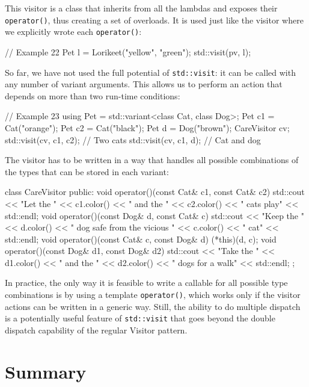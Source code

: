 This visitor is a class that inherits from all the lambdas and exposes their \texttt{operator()}, thus creating a set of overloads. It is used just like the visitor where we explicitly wrote each \texttt{operator()}:

\begin{code}
// Example 22
Pet l = Lorikeet("yellow", "green");
std::visit(pv, l);
\end{code}

So far, we have not used the full potential of \texttt{std::visit}: it can be called with any number of variant arguments. This allows us to perform an action that depends on more than two run-time conditions:

\begin{code}
// Example 23
using Pet = std::variant<class Cat, class Dog>;
Pet c1 = Cat("orange");
Pet c2 = Cat("black");
Pet d = Dog("brown");
CareVisitor cv;
std::visit(cv, c1, c2);      // Two cats
std::visit(cv, c1, d);     // Cat and dog
\end{code}

The visitor has to be written in a way that handles all possible combinations of the types that can be stored in each variant:

\begin{code}
class CareVisitor {
  public:
  void operator()(const Cat& c1, const Cat& c2) {
    std::cout << "Let the " << c1.color() << " and the "
              << c2.color() << " cats play" << std::endl; }
  void operator()(const Dog& d, const Cat& c) {
    std::cout << "Keep the " << d.color()
              << " dog safe from the vicious " << c.color()
              << " cat" << std::endl; }
  void operator()(const Cat& c, const Dog& d) {
    (*this)(d, c);
  }
  void operator()(const Dog& d1, const Dog& d2) {
    std::cout << "Take the " << d1.color() << " and the "
              << d2.color() << " dogs for a walk"
              << std::endl; }
};
\end{code}

In practice, the only way it is feasible to write a callable for all possible type combinations is by using a template \texttt{operator()}, which works only if the visitor actions can be written in a generic way. Still, the ability to do multiple dispatch is a potentially useful feature of \texttt{std::visit} that goes beyond the double dispatch capability of the regular Visitor pattern.

\section{Summary}

